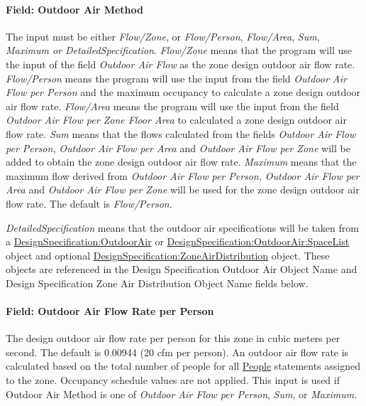 \paragraph{Field: Outdoor Air Method}\label{field-outdoor-air-method-1}

The input must be either \emph{Flow/Zone}, or \emph{Flow/Person}, \emph{Flow/Area}, \emph{Sum}, \emph{Maximum or DetailedSpecification}. \emph{Flow/Zone} means that the program will use the input of the field \emph{Outdoor Air Flow} as the zone design outdoor air flow rate. \emph{Flow/Person} means the program will use the input from the field \emph{Outdoor Air Flow per Person} and the maximum occupancy to calculate a zone design outdoor air flow rate. \emph{Flow/Area} means the program will use the input from the field \emph{Outdoor Air Flow per Zone Floor Area} to calculated a zone design outdoor air flow rate. \emph{Sum} means that the flows calculated from the fields \emph{Outdoor Air Flow per Person,} \emph{Outdoor Air Flow per Area} and \emph{Outdoor Air Flow per Zone} will be added to obtain the zone design outdoor air flow rate. \emph{Maximum} means that the maximum flow derived from \emph{Outdoor Air Flow per Person,} \emph{Outdoor Air Flow per Area} and \emph{Outdoor Air Flow per Zone} will be used for the zone design outdoor air flow rate. The default is \emph{Flow/Person}.

\emph{DetailedSpecification} means that the outdoor air specifications will be taken from a \hyperref[designspecificationoutdoorair]{DesignSpecification:OutdoorAir} or \hyperref[designspecificationoutdoorairspacelist]{DesignSpecification:OutdoorAir:SpaceList} object and optional \hyperref[designspecificationzoneairdistribution]{DesignSpecification:ZoneAirDistribution} object. These objects are referenced in the Design Specification Outdoor Air Object Name and Design Specification Zone Air Distribution Object Name fields below.

\paragraph{Field: Outdoor Air Flow Rate per Person}\label{field-outdoor-air-flow-rate-per-person-1}

The design outdoor air flow rate per person for this zone in cubic meters per second. The default is 0.00944 (20 cfm per person). An outdoor air flow rate is calculated based on the total number of people for all \hyperref[people]{People} statements assigned to the zone. Occupancy schedule values are not applied. This input is used if Outdoor Air Method is one of \emph{Outdoor Air Flow per Person}, \emph{Sum}, or \emph{Maximum.}

